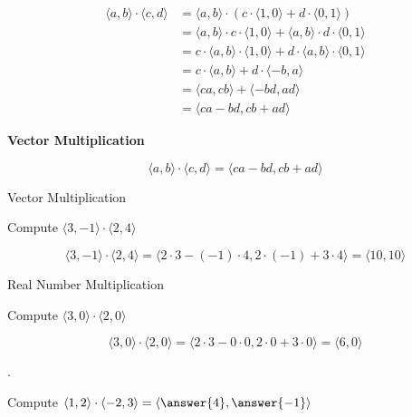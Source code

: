\documentclass{ximera}
\begin{document}
\begin{align*}
\langle a, b \rangle  \cdot \langle c, d \rangle & = \langle a, b \rangle  \cdot (  c \cdot \langle 1, 0 \rangle    +  d \cdot \langle 0, 1 \rangle    )    \\
    & = \langle a, b \rangle \cdot c \cdot \langle 1, 0 \rangle     +      \langle a, b \rangle \cdot d \cdot \langle 0, 1 \rangle      \\
    & = c \cdot \langle a, b \rangle \cdot  \langle 1, 0 \rangle     +    d \cdot  \langle a, b \rangle \cdot  \langle 0, 1 \rangle      \\
    & = c \cdot \langle a, b \rangle   + d \cdot  \langle -b, a \rangle \\
    & =  \langle c a, c b \rangle   +   \langle -b d, a d \rangle \\
    & =  \langle c a - b d, c b + a d \rangle   
\end{align*} 







\begin{definition}  \textbf{\textcolor{green!50!black}{Vector Multiplication}}  


\[    \langle a, b \rangle  \cdot \langle c, d \rangle =   \langle c a - b d, c b + a d \rangle   \]


\end{definition}








\begin{example} Vector Multiplication

Compute  $\langle 3, -1 \rangle  \cdot \langle 2, 4 \rangle$

\begin{explanation}


\[
\langle 3, -1 \rangle  \cdot \langle 2, 4 \rangle = \langle 2 \cdot 3 - (-1) \cdot 4, 2 \cdot (-1) + 3 \cdot 4 \rangle = \langle 10, 10 \rangle 
\]
\end{explanation}

\end{example}











\begin{example} Real Number Multiplication

Compute  $\langle 3, 0 \rangle  \cdot \langle 2, 0 \rangle$

\begin{explanation}


\[
\langle 3, 0 \rangle  \cdot \langle 2, 0 \rangle = \langle 2 \cdot 3 - 0 \cdot 0, 2 \cdot 0 + 3 \cdot 0 \rangle = \langle 6, 0 \rangle 
\]
\end{explanation}

\end{example}




\begin{question} .


Compute  $\langle 1, 2 \rangle  \cdot \langle -2, 3 \rangle = \left\langle \answer{4}, \answer{-1} \right\rangle $



\end{question}
\end{document}
